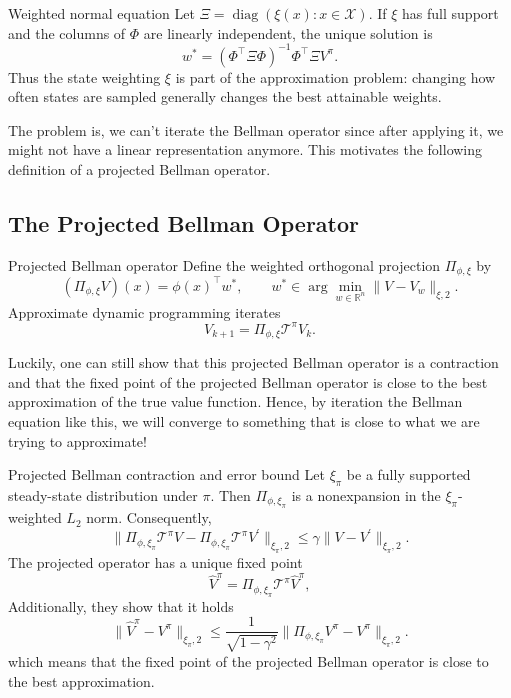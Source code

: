 \documentclass[12pt]{article}
\newcommand{\R}{\mathbb{R}}
\newcommand{\1}{\mathds{1}}
\newcommand{\X}{\mathcal{X}}
\newcommand{\T}{\mathcal{T}}
\newcommand{\norm}[1]{\lVert #1 \rVert}
\begin{document}
\begin{theorem}{Weighted normal equation}{}
Let $\Xi=\operatorname{diag}(\xi(x):x\in\X)$. If $\xi$ has full support and
the columns of $\Phi$ are linearly independent, the unique solution is
$$
  w^*=(\Phi^\top\Xi\Phi)^{-1}\Phi^\top\Xi V^\pi.
$$
Thus the state weighting $\xi$ is part of the approximation problem: changing
how often states are sampled generally changes the best attainable weights.
\end{theorem}
The problem is, we can't iterate the Bellman operator since after applying it, we might not have a linear representation anymore. This motivates the following definition of a projected Bellman operator. 

\subsection{The Projected Bellman Operator}

\begin{definition}{Projected Bellman operator}{}
Define the weighted orthogonal projection $\Pi_{\phi,\xi}$ by
$$
  (\Pi_{\phi,\xi}V)(x)=\phi(x)^\top w^*,
  \qquad
  w^*\in\arg\min_{w\in\R^n}\norm{V-V_w}_{\xi,2}.
$$
Approximate dynamic programming iterates
$$
  V_{k+1}=\Pi_{\phi,\xi}\T^\pi V_k.
$$
\end{definition}

Luckily, one can still show that this projected Bellman operator is a contraction and that the fixed point of the projected Bellman operator is close to the best approximation of the true value function. 
Hence, by iteration the Bellman equation like this, we will converge to something that is close to what we are trying to approximate!

\begin{theorem}{Projected Bellman contraction and error bound}{}
Let $\xi_\pi$ be a fully supported steady-state distribution under $\pi$. Then $\Pi_{\phi,\xi_\pi}$ is a nonexpansion in the
$\xi_\pi$-weighted $L_2$ norm. Consequently,
$$
  \norm{\Pi_{\phi,\xi_\pi}\T^\pi V-
  \Pi_{\phi,\xi_\pi}\T^\pi V^{\prime}}_{\xi_\pi,2}
  \leq \gamma\norm{V-V^{\prime}}_{\xi_\pi,2}.
$$
The projected operator has a unique fixed point
$$
  \widehat V^\pi
  =\Pi_{\phi,\xi_\pi}\T^\pi\widehat V^\pi,
$$
Additionally, they show that it holds
$$
  \norm{\widehat V^\pi-V^\pi}_{\xi_\pi,2}
  \leq\frac{1}{\sqrt{1-\gamma^2}}
  \norm{\Pi_{\phi,\xi_\pi}V^\pi-V^\pi}_{\xi_\pi,2}.
$$
which means that the fixed point of the projected Bellman operator is close to the best approximation.
\end{theorem}
\end{document}
